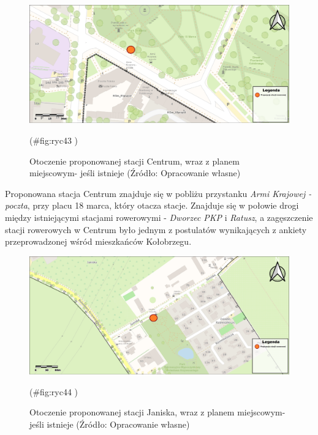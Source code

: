 \documentclass{amuthesis}
\begin{document}
\begin{figure}[t]

{\centering \includegraphics[width=1.05\linewidth]{figures/mapki_poglad/Centrum_l} 

}

\caption{Otoczenie proponowanej stacji Centrum, wraz z planem miejscowym- jeśli istnieje (Źródło: Opracowanie własne)}(\#fig:ryc43 )
\end{figure}

Proponowana stacja Centrum znajduje się w pobliżu przystanku \emph{Armi Krajowej - poczta}, przy placu 18 marca, który otacza stacje. Znajduje się w połowie drogi między istniejącymi stacjami rowerowymi - \emph{Dworzec PKP} i \emph{Ratusz}, a zagęszczenie stacji rowerowych w Centrum było jednym z postulatów wynikających z ankiety przeprowadzonej wśród mieszkańców Kołobrzegu.

\begin{figure}[t]

{\centering \includegraphics[width=1.05\linewidth]{figures/mapki_poglad/Janiska_l} 

}

\caption{Otoczenie proponowanej stacji Janiska, wraz z planem miejscowym- jeśli istnieje (Źródło: Opracowanie własne)}(\#fig:ryc44 )
\end{figure}
\end{document}
